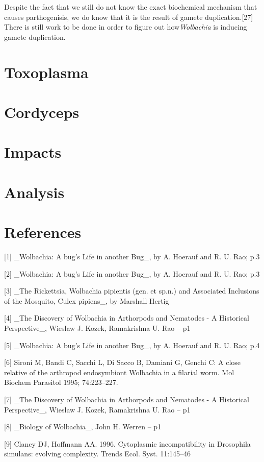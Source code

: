 \documentclass[twocolumn]{article}
\begin{document}
Despite the fact that we still do not know the exact biochemical mechanism that causes parthogenisis, we do know that it is the result of gamete duplication.[27] There is still work to be done in order to figure out how\textit{Wolbachia} is inducing gamete duplication.

\section*{Toxoplasma}

\section*{Cordyceps}

\section*{Impacts}

\section*{Analysis}

\section*{References}
[1] \_Wolbachia: A bug's Life in another Bug\_, by A. Hoerauf and R. U. Rao;  p.3 

[2] \_Wolbachia: A bug's Life in another Bug\_, by A. Hoerauf and R. U. Rao;  p.3

[3] \_The Rickettsia, Wolbachia pipientis (gen. et sp.n.) and Associated Inclusions of the Mosquito, Culex pipiens\_, by Marshall Hertig

[4] \_The Discovery of Wolbachia in Arthorpods and Nematodes - A Historical Perspective\_, Wieslaw J. Kozek, Ramakrishna U. Rao  -- p1

[5] \_Wolbachia: A bug's Life in another Bug\_, by A. Hoerauf and R. U. Rao;  p.4

[6] Sironi M, Bandi C, Sacchi L, Di Sacco B, Damiani G, Genchi C: A close relative of the arthropod endosymbiont Wolbachia in a filarial worm. Mol Biochem Parasitol 1995; 74:223–227.

[7] \_The Discovery of Wolbachia in Arthorpods and Nematodes - A Historical Perspective\_, Wieslaw J. Kozek, Ramakrishna U. Rao  -- p1

[8] \_Biology of Wolbachia\_, John H. Werren  -- p1

[9] Clancy DJ, Hoffmann AA. 1996. Cytoplasmic incompatibility in Drosophila simulans: evolving complexity. Trends Ecol. Syst. 11:145–46
\end{document}
